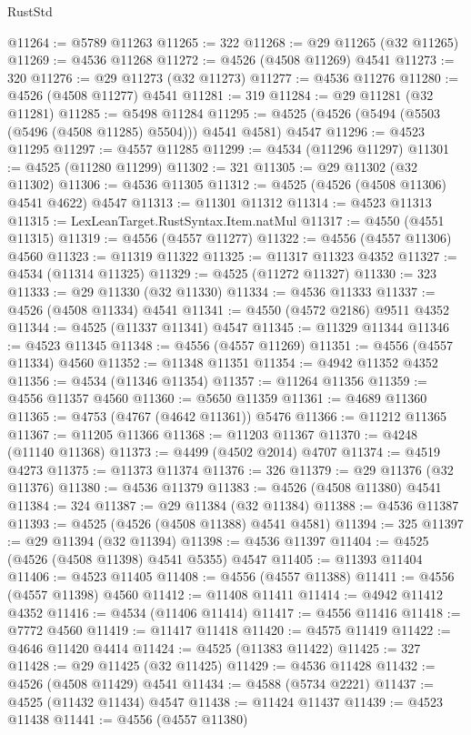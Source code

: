 \begin{lexlean}{RustStd}
\begin{coremodule}
{\begin{coremodule}
{{{{{{{{{{{{{{{{{{{{{{{{{{{{{{{{{{{{{{{{{{{{{{{{{{{{{{{@11264 := @5789 @11263
@11265 := 322
@11268 := @29 @11265 (@32 @11265)
@11269 := @4536 @11268
@11272 := @4526 (@4508 @11269) @4541
@11273 := 320
@11276 := @29 @11273 (@32 @11273)
@11277 := @4536 @11276
@11280 := @4526 (@4508 @11277) @4541
@11281 := 319
@11284 := @29 @11281 (@32 @11281)
@11285 := @5498 @11284
@11295 := @4525 (@4526 (@5494 (@5503 (@5496 (@4508 @11285) @5504))) @4541 @4581) @4547
@11296 := @4523 @11295
@11297 := @4557 @11285
@11299 := @4534 (@11296 @11297)
@11301 := @4525 (@11280 @11299)
@11302 := 321
@11305 := @29 @11302 (@32 @11302)
@11306 := @4536 @11305
@11312 := @4525 (@4526 (@4508 @11306) @4541 @4622) @4547
@11313 := @11301 @11312
@11314 := @4523 @11313
@11315 := LexLeanTarget.RustSyntax.Item.natMul
@11317 := @4550 (@4551 @11315)
@11319 := @4556 (@4557 @11277)
@11322 := @4556 (@4557 @11306) @4560
@11323 := @11319 @11322
@11325 := @11317 @11323 @4352
@11327 := @4534 (@11314 @11325)
@11329 := @4525 (@11272 @11327)
@11330 := 323
@11333 := @29 @11330 (@32 @11330)
@11334 := @4536 @11333
@11337 := @4526 (@4508 @11334) @4541
@11341 := @4550 (@4572 @2186) @9511 @4352
@11344 := @4525 (@11337 @11341) @4547
@11345 := @11329 @11344
@11346 := @4523 @11345
@11348 := @4556 (@4557 @11269)
@11351 := @4556 (@4557 @11334) @4560
@11352 := @11348 @11351
@11354 := @4942 @11352 @4352
@11356 := @4534 (@11346 @11354)
@11357 := @11264 @11356
@11359 := @4556 @11357 @4560
@11360 := @5650 @11359
@11361 := @4689 @11360
@11365 := @4753 (@4767 (@4642 @11361)) @5476
@11366 := @11212 @11365
@11367 := @11205 @11366
@11368 := @11203 @11367
@11370 := @4248 (@11140 @11368)
@11373 := @4499 (@4502 @2014) @4707
@11374 := @4519 @4273
@11375 := @11373 @11374
@11376 := 326
@11379 := @29 @11376 (@32 @11376)
@11380 := @4536 @11379
@11383 := @4526 (@4508 @11380) @4541
@11384 := 324
@11387 := @29 @11384 (@32 @11384)
@11388 := @4536 @11387
@11393 := @4525 (@4526 (@4508 @11388) @4541 @4581)
@11394 := 325
@11397 := @29 @11394 (@32 @11394)
@11398 := @4536 @11397
@11404 := @4525 (@4526 (@4508 @11398) @4541 @5355) @4547
@11405 := @11393 @11404
@11406 := @4523 @11405
@11408 := @4556 (@4557 @11388)
@11411 := @4556 (@4557 @11398) @4560
@11412 := @11408 @11411
@11414 := @4942 @11412 @4352
@11416 := @4534 (@11406 @11414)
@11417 := @4556 @11416
@11418 := @7772 @4560
@11419 := @11417 @11418
@11420 := @4575 @11419
@11422 := @4646 @11420 @4414
@11424 := @4525 (@11383 @11422)
@11425 := 327
@11428 := @29 @11425 (@32 @11425)
@11429 := @4536 @11428
@11432 := @4526 (@4508 @11429) @4541
@11434 := @4588 (@5734 @2221)
@11437 := @4525 (@11432 @11434) @4547
@11438 := @11424 @11437
@11439 := @4523 @11438
@11441 := @4556 (@4557 @11380)
}}}}}}}}}}}}}}}}}}}}}}}}}}}}}}}}}}}}}}}}}}}}}}}}}}}}}}}
\end{coremodule}}
\end{coremodule}
\end{lexlean}
